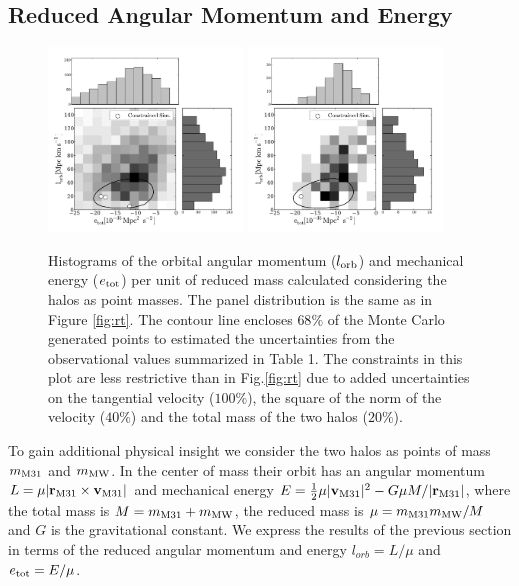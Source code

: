 \documentclass{emulateapj}
\begin{document}
\subsection{Reduced Angular Momentum and Energy}

\begin{figure}
\begin{center}
\includegraphics[keepaspectratio=true,width=0.46\textwidth]{./figures/test_EJ_BDM.pdf}
\includegraphics[keepaspectratio=true,width=0.46\textwidth]{./figures/test_EJ_BDM_narrow.pdf}
\caption{Histograms of the orbital angular momentum ($l_{\rm orb}$) and mechanical energy ($e_{\rm tot}$) per unit of reduced mass calculated considering the halos as point masses. The panel distribution is the same as in Figure \ref{fig:rt}. The contour line encloses $68\%$ of the Monte Carlo generated points to estimated the uncertainties from the observational values summarized in Table 1. The constraints in this plot are less restrictive than in Fig.\ref{fig:rt} due to added uncertainties on the tangential velocity ($100\%$), the square of the norm of the velocity ($40\%$) and the total mass of the two halos ($20\%$). }
\label{fig:EJ}
\end{center}
\end{figure}




To gain additional physical insight we consider the two halos as points of mass $m_{\rm M31}$ and $m_{\rm MW}$. In the center of mass their orbit has an angular momentum $L=\mu|{{\bf r}_{\rm M31}}\times{\bf v}_{\rm M31}|$ and mechanical energy $E=\frac{1}{2}\mu |{\bf v}_{\rm M31}|^2 - G\mu M/|{\bf r}_{\rm M31}|$, where the total mass is $M=m_{\rm M31}+m_{\rm MW}$, the reduced mass is $\mu=m_{\rm M31}m_{\rm MW}/M$ and $G$ is the gravitational constant. We express the results of the previous section in terms of the reduced angular momentum and energy $l_{orb}=L/\mu$ and $e_{\rm tot}=E/\mu$. 
\end{document}
